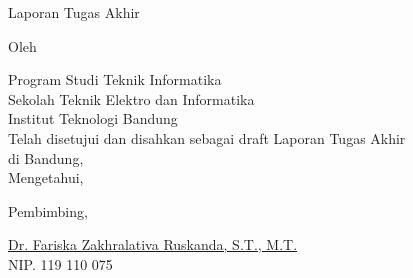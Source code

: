 \clearpage
\pagestyle{empty}

\begin{center}
    \smallskip
    
    \Large \bfseries \MakeUppercase{\thetitle}
    \vfill
    
    \Large Laporan Tugas Akhir
    \vfill
    
    \large Oleh
    
    \Large \theauthor
    
    \large Program Studi Teknik Informatika \\
    
    \normalsize \normalfont
    Sekolah Teknik Elektro dan Informatika \\
    Institut Teknologi Bandung \\
    
    \vfill
    \normalsize \normalfont
    Telah disetujui dan disahkan sebagai draft Laporan Tugas Akhir\\ 
    di Bandung, \tanggalpengesahan \\
    Mengetahui,
    
    \vspace{0.5cm}
    Pembimbing,
    
    \vfill
    \underline{Dr. Fariska Zakhralativa Ruskanda, S.T., M.T.} \\
    NIP. 119 110 075
    
\end{center}
\clearpage
